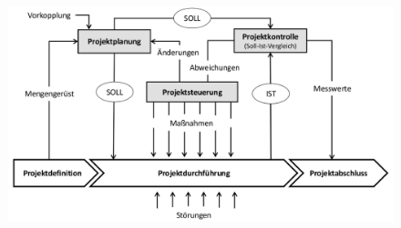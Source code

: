 \documentclass[11pt,a4paper]{article}
\begin{document}
\begin{figure}[H]
\centering
\includegraphics[width=\textwidth]{ch11/regelkreispc}
\end{figure}
\end{document}
